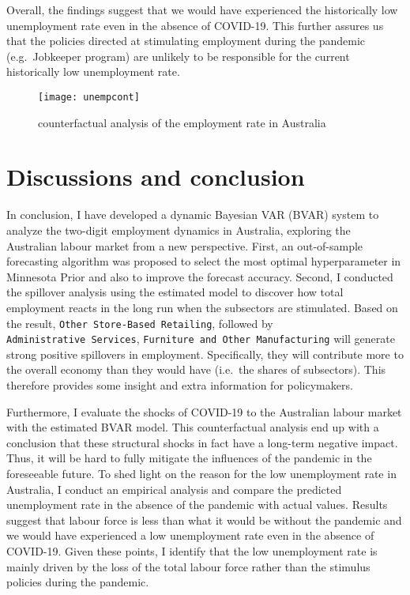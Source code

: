 \documentclass{monashthesis}
\begin{document}
Overall, the findings suggest that we would have experienced the historically low unemployment rate even in the absence of COVID-19. This further assures us that the policies directed at stimulating employment during the pandemic (e.g.~Jobkeeper program) are unlikely to be responsible for the current historically low unemployment rate.

\begin{figure}[H]
\texttt{[image: unempcont]}
\centering
\caption{counterfactual analysis of the employment rate in Australia}
\label{fig:unrate}
\end{figure}

\clearpage

\hypertarget{discussions-and-conclusion}{%
\chapter{Discussions and conclusion}\label{discussions-and-conclusion}}

In conclusion, I have developed a dynamic Bayesian VAR (BVAR) system to analyze the two-digit employment dynamics in Australia, exploring the Australian labour market from a new perspective. First, an out-of-sample forecasting algorithm was proposed to select the most optimal hyperparameter in Minnesota Prior and also to improve the forecast accuracy. Second, I conducted the spillover analysis using the estimated model to discover how total employment reacts in the long run when the subsectors are stimulated. Based on the result, \texttt{Other\ Store-Based\ Retailing}, followed by \texttt{Administrative\ Services}, \texttt{Furniture\ and\ Other\ Manufacturing} will generate strong positive spillovers in employment. Specifically, they will contribute more to the overall economy than they would have (i.e.~the shares of subsectors). This therefore provides some insight and extra information for policymakers.

Furthermore, I evaluate the shocks of COVID-19 to the Australian labour market with the estimated BVAR model. This counterfactual analysis end up with a conclusion that these structural shocks in fact have a long-term negative impact. Thus, it will be hard to fully mitigate the influences of the pandemic in the foreseeable future. To shed light on the reason for the low unemployment rate in Australia, I conduct an empirical analysis and compare the predicted unemployment rate in the absence of the pandemic with actual values. Results suggest that labour force is less than what it would be without the pandemic and we would have experienced a low unemployment rate even in the absence of COVID-19. Given these points, I identify that the low unemployment rate is mainly driven by the loss of the total labour force rather than the stimulus policies during the pandemic.
\end{document}

